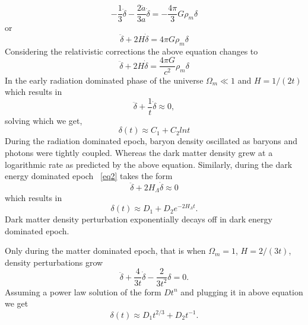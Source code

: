 \begin{equation}
- \frac{1}{3}\ddot{\delta} - \frac{2\dot{a}}{3a} \dot{\delta}  = -\frac{4 \pi}{3} G\rho_{m}\delta
\end{equation}
or
\begin{equation}
\ddot{\delta} + 2 H\dot{\delta} = 4\pi G \rho_{m} \delta
\end{equation}
Considering the relativistic corrections the above equation changes to 
\begin{equation}
\ddot{\delta} + 2 H \dot{\delta} = \frac{4\pi G}{c^{2}} \rho_{m} \delta
\label{eq2}
\end{equation}
In the early radiation dominated phase of the universe $\Omega_{m} \ll 1$ and $H = 1/(2t)$ which results in 
\begin{equation}
\ddot{\delta} + \frac{1}{t} \dot{\delta} \approx 0,
\end{equation}
solving which we get,
\begin{equation}
\delta(t) \approx C_{1} + C_{2} lnt
\end{equation}
During the radiation dominated epoch, baryon density oscillated as baryons and photons were tightly coupled. 
Whereas the dark matter density grew at a logarithmic rate as predicted by the above equation.  
Similarly, during the dark energy dominated epoch ~\ref{eq2} takes the form
\begin{equation}
\ddot{\delta} + 2 H_{\Lambda} \dot{\delta} \approx 0
\end{equation}
which results in
\begin{equation}
\delta(t) \approx D_{1} + D_{2}e^{-2H_{\Lambda} t}.
\end{equation}
Dark matter density perturbation exponentially decays off in dark energy dominated epoch. 


Only during the matter dominated epoch, that is when $\Omega_{m} = 1$, $H = 2/(3t)$, density perturbations grow
\begin{equation}
\ddot{\delta} + \frac{4}{3t} \dot{\delta} -\frac{2}{3t^{2}} \delta = 0.
\end{equation}  
Assuming a power law solution of the form $Dt^{n}$  and plugging it in above equation we get
\begin{equation}
\delta(t) \approx D_{1} t^{2/3} + D_{2} t^{-1}.
\end{equation}

